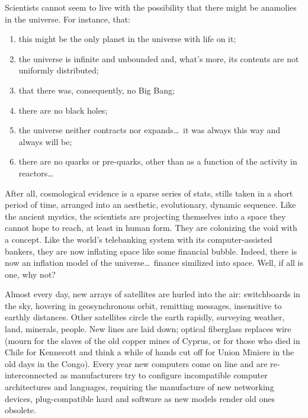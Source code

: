 Scientists cannot seem to live with the possibility that there might be anamolies in the universe. For instance, that: 
\begin{enumerate}
\item this might be the only planet in the universe with life on it; 
\item the universe is infinite and unbounded and, what's more, its contents are not uniformly distributed;
\item that there was, consequently, no Big Bang; 
\item there are no black holes; 
\item the universe neither contracts nor expands\ldots\ it was always this way and always will be; 
\item there are no quarks or pre-quarks, other than as a function of the activity in reactors\ldots
\end{enumerate}
After all, cosmological evidence is a sparse series of stats, stills taken in a short period of time, arranged into an aesthetic, evolutionary, dynamic sequence. Like the ancient mystics, the scientists are projecting themselves into a space they cannot hope to reach, at least in human form. They are colonizing the void with a concept. Like the world's telebanking system with its computer-assisted bankers, they are now inflating space like some financial bubble. Indeed, there is now an inflation model of the universe\ldots\ finance similized into space. Well, if all is one, why not?

Almost every day, new arrays of satellites are hurled into the air: switchboards in the sky, hovering in geosynchronous orbit, remitting messages, insensitive to earthly distances. Other satellites circle the earth rapidly, surveying weather, land, minerals, people. New lines are laid down; optical fiberglass replaces wire (mourn for the slaves of the old copper mines of Cyprus, or for those who died in Chile for Kennecott and think a while of hands cut off for Union Miniere in the old days in the Congo). Every year new computers come on line and are re-interconnected as manufacturers try to configure incompatible computer architectures and languages, requiring the manufacture of new networking devices, plug-compatible hard and software as new models render old ones obsolete.

